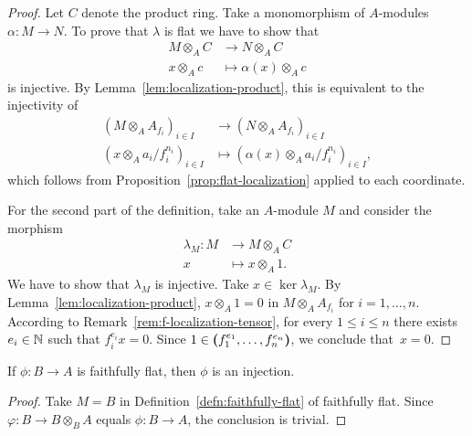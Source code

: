 \begin{proof}
    Let $C$ denote the product ring. Take a monomorphism of $A$-modules $\alpha\colon M\to N$. To prove that $\lambda$ is flat we have to show that
    \begin{align*}
        M\otimes_AC&\to N\otimes_AC\\
        x\otimes_Ac
            &\mapsto\alpha(x)\otimes_Ac
    \end{align*}
    is injective. By Lemma~\ref{lem:localization-product}, this is equivalent to the injectivity of
    \begin{align*}
        (M\otimes_AA_{f_i})_{i\in I}&\to(N\otimes_AA_{f_i})_{i\in I}\\
        (x\otimes_Aa_i/f_i^{n_i})_{i\in I}
            &\mapsto(\alpha(x)\otimes_Aa_i/f_i^{n_i})_{i\in I},
    \end{align*}
    which follows from Proposition~\ref{prop:flat-localization} applied to each coordinate.

    For the second part of the definition, take an $A$-module $M$ and consider the morphism
    \begin{align*}
        \lambda_M\colon M&\to M\otimes_AC\\
        x&\mapsto x\otimes_A1.
    \end{align*}
    We have to show that $\lambda_M$ is injective. Take $x\in\ker\lambda_M$. By Lemma~\ref{lem:localization-product}, $x\otimes_A1=0$ in $M\otimes_AA_{f_i}$ for $i=1,\dots,n$. According to Remark~\ref{rem:f-localization-tensor}, for every $1\le i\le n$ there exists $e_i\in\mathbb{N}$ such that $f_i^{e_i}x=0$. Since $1\in\textrm{\boldmath$($}f_1^{e_1},\dots,f_n^{e_n}\textrm{\boldmath$)$}$, we conclude that~$x=0$.
\end{proof}

\begin{lem}
    If\/ $\phi\colon B\to A$ is faithfully flat, then\/ $\phi$ is an injection.
\end{lem}

\begin{proof}
    Take $M=B$ in Definition~\ref{defn:faithfully-flat} of faithfully flat. Since $\varphi\colon B\to B\otimes_BA$ equals $\phi\colon B\to A$, the conclusion is trivial.
\end{proof}

